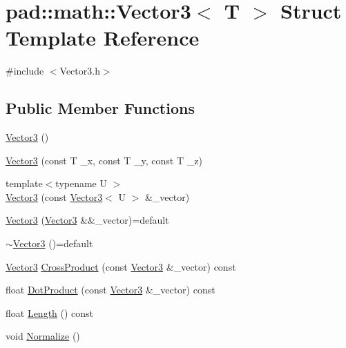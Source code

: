 \hypertarget{structpad_1_1math_1_1_vector3}{}\section{pad\+:\+:math\+:\+:Vector3$<$ T $>$ Struct Template Reference}
\label{structpad_1_1math_1_1_vector3}


{\ttfamily \#include $<$Vector3.\+h$>$}

\subsection*{Public Member Functions}
\begin{DoxyCompactItemize}
\item 
\mbox{\hyperlink{structpad_1_1math_1_1_vector3_a06aefc4e209e7e8ab954c9124e9f663f}{Vector3}} ()
\item 
\mbox{\hyperlink{structpad_1_1math_1_1_vector3_a0770fb886ae92f895ce0258e28a1a1eb}{Vector3}} (const T \+\_\+x, const T \+\_\+y, const T \+\_\+z)
\item 
{\footnotesize template$<$typename U $>$ }\\\mbox{\hyperlink{structpad_1_1math_1_1_vector3_a7f6a17638301c9ddaec4ea300a3c846a}{Vector3}} (const \mbox{\hyperlink{structpad_1_1math_1_1_vector3}{Vector3}}$<$ U $>$ \&\+\_\+vector)
\item 
\mbox{\hyperlink{structpad_1_1math_1_1_vector3_adf7a624bdd20e8d79c6fe663c36ce43b}{Vector3}} (\mbox{\hyperlink{structpad_1_1math_1_1_vector3}{Vector3}} \&\&\+\_\+vector)=default
\item 
\mbox{\hyperlink{structpad_1_1math_1_1_vector3_a8a778f1112409992f9e95a10f9760cfd}{$\sim$\+Vector3}} ()=default
\item 
\mbox{\hyperlink{structpad_1_1math_1_1_vector3}{Vector3}} \mbox{\hyperlink{structpad_1_1math_1_1_vector3_ac2e50febe3b0e838a515ad17017050c8}{Cross\+Product}} (const \mbox{\hyperlink{structpad_1_1math_1_1_vector3}{Vector3}} \&\+\_\+vector) const
\item 
float \mbox{\hyperlink{structpad_1_1math_1_1_vector3_adf5f36332f64f4d6e90144e514e8c84c}{Dot\+Product}} (const \mbox{\hyperlink{structpad_1_1math_1_1_vector3}{Vector3}} \&\+\_\+vector) const
\item 
float \mbox{\hyperlink{structpad_1_1math_1_1_vector3_a9461a10c56017a46fe943a89d6390d38}{Length}} () const
\item 
void \mbox{\hyperlink{structpad_1_1math_1_1_vector3_a76c70ba64ff0c1b27e26d444bfdd3de5}{Normalize}} ()

\end{DoxyCompactItemize}
